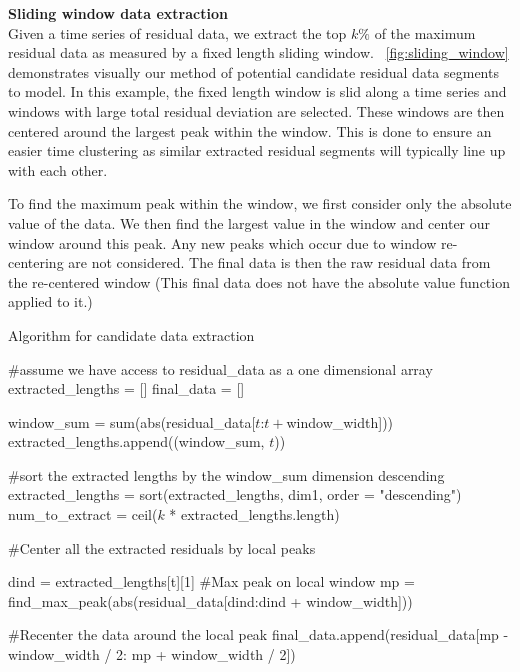 \bigskip
\noindent \textbf{Sliding window data extraction} \\
Given a time series of residual data, we extract the top $k\%$ of the maximum residual data as measured by a fixed length sliding window.  ~\ref{fig:sliding_window} demonstrates visually our method of potential candidate residual data segments to model.  In this example, the fixed length window is slid along a time series and windows with large total residual deviation are selected.  These windows are then centered around the largest peak within the window.  This is done to ensure an easier time clustering as similar extracted residual segments will typically line up with each other.

To find the maximum peak within the window, we first consider only the absolute value of the data.  We then find the largest value in the window and center our window around this peak.  Any new peaks which occur due to window re-centering are not considered.  The final data is then the raw residual data from the re-centered window (This final data does not have the absolute value function applied to it.)

\begin{algorithm}
	\caption{Algorithm for candidate data extraction}
   	\label{alg:dataextract}
	
	\begin{algorithmic}
		\State \#assume we have access to residual\_data as a one dimensional array
		\State 
		\State extracted\_lengths = []
		\State final\_data = []
   		\State 
				
		\State	window\_sum = sum(abs(residual\_data[$t$:$t+$window\_width]))
		\State 	extracted\_lengths.append((window\_sum, $t$))
		\EndFor
		
		\State
		\State \#sort the extracted lengths by the window\_sum dimension descending
		\State extracted\_lengths = sort(extracted\_lengths, dim1, order = "descending")
		\State num\_to\_extract = ceil($k$ * extracted\_lengths.length)
		
		\State
		\State \#Center all the extracted residuals by local peaks
		
		\State 	dind = extracted\_lengths[t][1]
		\State	\#Max peak on local window
		\State	mp = find\_max\_peak(abs(residual\_data[dind:dind + window\_width]))
		
		\State
		\State 	\#Recenter the data around the local peak
		\State	final\_data.append(residual\_data[mp - window\_width / 2: mp + window\_width / 2])

		\EndFor

	\end{algorithmic}
\end{algorithm}

